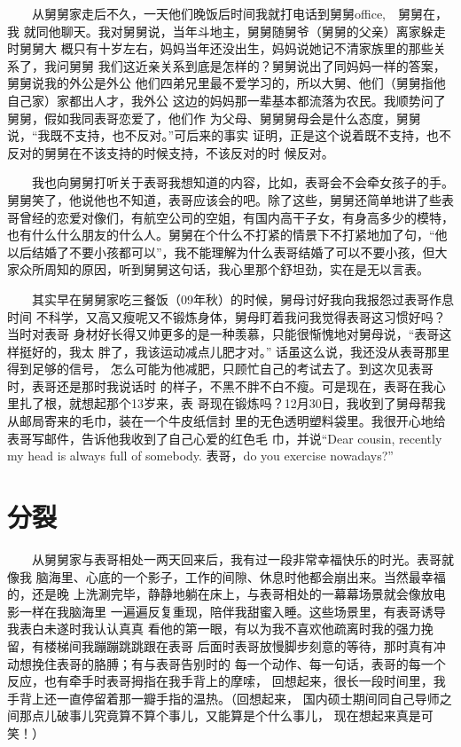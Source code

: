 \documentclass[12pt]{book}
\begin{document}
　　从舅舅家走后不久，一天他们晚饭后时间我就打电话到舅舅office,　舅舅在，我
就同他聊天。我对舅舅说，当年斗地主，舅舅随舅爷（舅舅的父亲）离家躲走时舅舅大
概只有十岁左右，妈妈当年还没出生，妈妈说她记不清家族里的那些关系了，我问舅舅
我们这近亲关系到底是怎样的？舅舅说出了同妈妈一样的答案，舅舅说我的外公是外公
他们四弟兄里最不爱学习的，所以大舅、他们（舅舅指他自己家）家都出人才，我外公
这边的妈妈那一辈基本都流落为农民。我顺势问了舅舅，假如我同表哥恋爱了，他们作
为父母、舅舅舅母会是什么态度，舅舅说，“我既不支持，也不反对。”可后来的事实
证明，正是这个说着既不支持，也不反对的舅舅在不该支持的时候支持，不该反对的时
候反对。

　　我也向舅舅打听关于表哥我想知道的内容，比如，表哥会不会牵女孩子的手。舅舅笑了，他说他也不知道，表哥应该会的吧。除了这些，舅舅还简单地讲了些表哥曾经的恋爱对像们，有航空公司的空姐，有国内高干子女，有身高多少的模特，也有什么什么朋友的什么人。舅舅在个什么不打紧的情景下不打紧地加了句，“他以后结婚了不要小孩都可以”，我不能理解为什么表哥结婚了可以不要小孩，但大家众所周知的原因，听到舅舅这句话，我心里那个舒坦劲，实在是无以言表。

　　其实早在舅舅家吃三餐饭（09年秋）的时候，舅母讨好我向我报怨过表哥作息时间
不科学，又高又瘦呢又不锻炼身体，舅母盯着我问我觉得表哥这习惯好吗？当时对表哥
身材好长得又帅更多的是一种羡慕，只能很惭愧地对舅母说，“表哥这样挺好的，我太
胖了，我该运动减点儿肥才对。” 话虽这么说，我还没从表哥那里得到足够的信号，
怎么可能为他减肥，只顾忙自己的考试去了。到这次见表哥时，表哥还是那时我说话时
的样子，不黑不胖不白不瘦。可是现在，表哥在我心里扎了根，就想起那个13岁来，表
哥现在锻炼吗？12月30日，我收到了舅母帮我从邮局寄来的毛巾，装在一个牛皮纸信封
里的无色透明塑料袋里。我很开心地给表哥写邮件，告诉他我收到了自己心爱的红色毛
巾，并说“Dear cousin, recently my head is always full of somebody. 表哥，do
you exercise nowadays?”
\section{分裂}
\label{sec-7-10}

　　从舅舅家与表哥相处一两天回来后，我有过一段非常幸福快乐的时光。表哥就像我
脑海里、心底的一个影子，工作的间隙、休息时他都会崩出来。当然最幸福的，还是晚
上洗涮完毕，静静地躺在床上，与表哥相处的一幕幕场景就会像放电影一样在我脑海里
一遍遍反复重现，陪伴我甜蜜入睡。这些场景里，有表哥诱导我表白未遂时我认认真真
看他的第一眼，有以为我不喜欢他疏离时我的强力挽留，有楼梯间我蹦蹦跳跳跟在表哥
后面时表哥放慢脚步刻意的等待，那时真有冲动想挽住表哥的胳膊；有与表哥告别时的
每一个动作、每一句话，表哥的每一个反应，也有牵手时表哥拇指在我手背上的摩嗦，
回想起来，很长一段时间里，我手背上还一直停留着那一瓣手指的温热。（回想起来，
国内硕士期间同自己导师之间那点儿破事儿究竟算不算个事儿，又能算是个什么事儿，
现在想起来真是可笑！）
\end{document}
